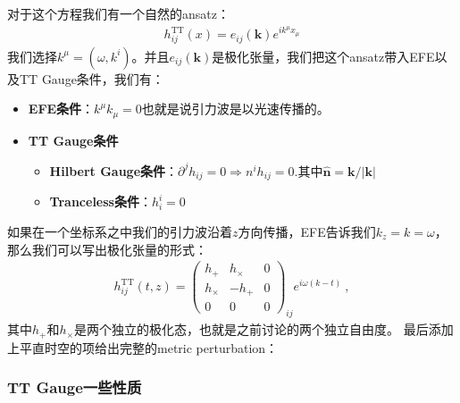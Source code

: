 对于这个方程我们有一个自然的ansatz：
\begin{align}
  h_{ij}^{\mathrm{TT}}(x)=e_{ij}(\mathbf{k})e^{ik^\mu x_\mu}
\end{align}
我们选择$ k^\mu = (\omega, k^i) $。并且$ e_{ij}(\mathbf{k}) $是极化张量，我们把这个ansatz带入EFE以及TT Gauge条件，我们有：
\begin{itemize}
  \item \textbf{EFE条件}：$ k^\mu k_\mu = 0 $也就是说引力波是以光速传播的。
  \item \textbf{TT Gauge条件}
    \begin{itemize}
      \item \textbf{Hilbert Gauge条件}：$ \partial^jh_{ij}=0 \Rightarrow n^ih_{ij}=0. $其中$ \hat{\mathbf{n}}=\mathbf{k}/|\mathbf{k}| $
      \item \textbf{Tranceless条件}：$ h^i_i = 0 $
    \end{itemize}
\end{itemize}
如果在一个坐标系之中我们的引力波沿着$ z $方向传播，EFE告诉我们$ k_z = k = \omega $，那么我们可以写出极化张量的形式：
\begin{align}
  \left.h_{ij}^{\mathrm{TT}}(t,z)=\left(\begin{array}{ccc}h_+&h_\times&0\\h_\times&-h_+&0\\0&0&0\end{array}\right.\right)_{ij}e^{i\omega (k- t)}\mathrm{~,}
\end{align}
其中$ h_+ $和$ h_\times $是两个独立的极化态，也就是之前讨论的两个独立自由度。
最后添加上平直时空的项给出完整的metric perturbation：

\subsubsection{TT Gauge一些性质}\label{sec:ttgaugeprop}
\bigskip
{}

